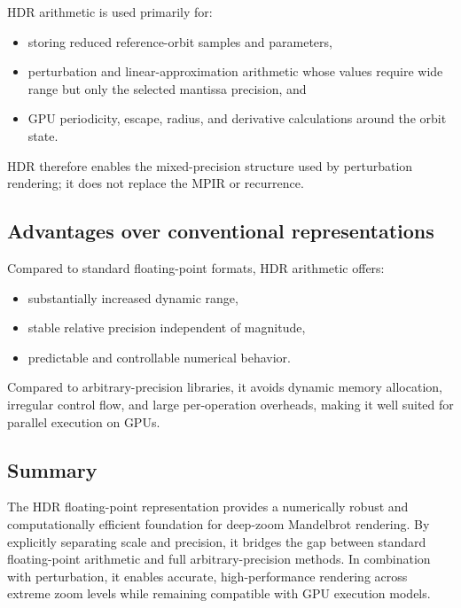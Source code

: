 HDR arithmetic is used primarily for:
\begin{itemize}
\item storing reduced reference-orbit samples and parameters,
\item perturbation and linear-approximation arithmetic whose values require wide
      range but only the selected mantissa precision, and
\item GPU periodicity, escape, radius, and derivative calculations around the
       orbit state.
\end{itemize}

HDR therefore enables the mixed-precision structure used by perturbation
rendering; it does not replace the MPIR or  recurrence.

\subsection{Advantages over conventional representations}

Compared to standard floating-point formats, HDR arithmetic offers:
\begin{itemize}
\item substantially increased dynamic range,
\item stable relative precision independent of magnitude,
\item predictable and controllable numerical behavior.
\end{itemize}

Compared to arbitrary-precision libraries, it avoids dynamic memory allocation,
irregular control flow, and large per-operation overheads, making it well suited
for parallel execution on GPUs.

\subsection{Summary}

The HDR floating-point representation provides a numerically robust and
computationally efficient foundation for deep-zoom Mandelbrot rendering. By
explicitly separating scale and precision, it bridges the gap between standard
floating-point arithmetic and full arbitrary-precision methods. In combination
with perturbation, it enables accurate, high-performance rendering across
extreme zoom levels while remaining compatible with GPU execution models.

